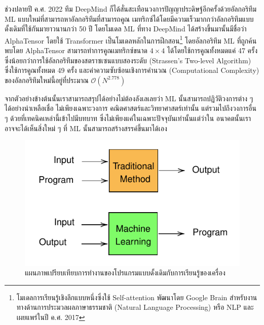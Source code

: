 ช่วงปลายปี ค.ศ. 2022 ทีม DeepMind ก็ได้สั่นสะเทือนวงการปัญญาประดิษฐ์อีกครั้งด้วยอัลกอริทึม ML แบบใหม่ที่สามารถหาอัลกอริทึมที่สามารถคูณ%
เมทริกซ์ได้โดยมีความเร็วมากกว่าอัลกอริทึมแบบดั้งเดิมที่ใช้กันมายาวนานกว่า 50 ปี โดยโมเดล ML ที่ทาง DeepMind ได้สร้างขึ้นมานั้นมีชื่อว่า 
AlphaTensor โดยใช้ Transformer\autocite{vaswani2017} เป็นโมเดลหลักในการฝึกสอน\footnote{โมเดลการเรียนรู้เชิงลึกแบบหนึ่งซึ่งใช้ 
Self-attention พัฒนาโดย Google Brain สำหรับงานทางด้านการประมวลผลภาษาธรรมชาติ (Natural Language Processing) หรือ 
NLP และเผยแพร่ในปี ค.ศ. 2017} โดยอัลกอริทึม ML ที่ถูกค้นพบโดย AlphaTensor สามารถทำการคูณเมทริกซ์ขนาด $4 \times 4$ 
ได้โดยใช้การคูณทั้งหมดแค่ 47 ครั้ง ซึ่งน้อยกว่าการใช้อัลกอริทึมของสตราซเซนแบบสองระดับ (Strassen's Two-level Algorithm) 
ซึ่งใช้การคูณทั้งหมด 49 ครั้ง\autocite{strassen1969}  และค่าความซับซ้อนเชิงการคำนวณ (Computational Complexity) 
ของอัลกอริทึมใหม่นี้อยู่ที่ประมาณ ${\mathcal{O}}({N}^{2.778})$ 

จากตัวอย่างข้างต้นนั้นเราสามารถสรุปได้อย่างไม่ต้องลังเลเลยว่า ML นั้นสามารถปฏิวัติวงการต่าง ๆ ได้อย่างน่าเหลือเชื่อ ไม่เพียงเฉพาะวงการ%
คณิตศาสตร์และวิทยาศาสตร์เท่านั้น แต่รวมไปถึงวงการอื่น ๆ ด้วยที่เทคนิคเหล่านี้เข้าไปมีบทบาท ซึ่งไม่เพียงแค่ในเฉพาะปัจจุบันเท่านั้นแต่ว่าใน%
อนาคตนั้นเราอาจจะได้เห็นสิ่งใหม่ ๆ ที่ ML นั้นสามารถสร้างสรรค์ขึ้นมาได้เอง

\begin{figure}[htbp]
    \centering
    \includegraphics[scale=1]{fig/ML-concept.pdf}
    \caption{แผนภาพเปรียบเทียบการทำงานของโปรแกรมแบบดั้งเดิมกับการเรียนรู้ของเครื่อง}
    \label{fig:ml_paradigm}
\end{figure}

